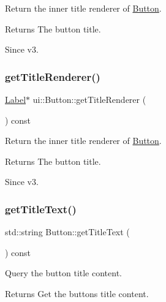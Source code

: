 Return the inner title renderer of \hyperlink{classui_1_1Button}{Button}. \begin{DoxyReturn}{Returns}
The button title. 
\end{DoxyReturn}
\begin{DoxySince}{Since}
v3. 
\end{DoxySince}
\mbox{\label{classui_1_1Button_a7380e84b871dcd61212c207ac96e34ae}} 
\subsubsection{\texorpdfstring{get\+Title\+Renderer()}{getTitleRenderer()}\hspace{0.1cm}{\footnotesize\ttfamily [2/2]}}
{\footnotesize\ttfamily \hyperlink{classLabel}{Label}$\ast$ ui\+::\+Button\+::get\+Title\+Renderer (\begin{DoxyParamCaption}{ }\end{DoxyParamCaption}) const}

Return the inner title renderer of \hyperlink{classui_1_1Button}{Button}. \begin{DoxyReturn}{Returns}
The button title. 
\end{DoxyReturn}
\begin{DoxySince}{Since}
v3. 
\end{DoxySince}
\mbox{\label{classui_1_1Button_abd02d3d7300b3b0bb0c29e18cae90190}} 
\subsubsection{\texorpdfstring{get\+Title\+Text()}{getTitleText()}\hspace{0.1cm}{\footnotesize\ttfamily [1/2]}}
{\footnotesize\ttfamily std\+::string Button\+::get\+Title\+Text (\begin{DoxyParamCaption}{ }\end{DoxyParamCaption}) const}

Query the button title content. \begin{DoxyReturn}{Returns}
Get the button\textquotesingle{}s title content. 
\end{DoxyReturn}
\mbox{\label{classui_1_1Button_a430885cd3746d44e3af92d94f4557ecf}} 
